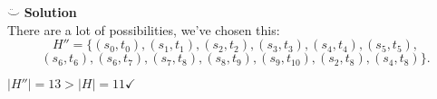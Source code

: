 $\ddot\smile$ \textbf{Solution}\\
There are a lot of possibilities, we've chosen this:\\
$$H'' = \{ (s_0, t_0), (s_1, t_1), (s_2, t_2), (s_3, t_3), (s_4, t_4), (s_5, t_5), $$
$$(s_6, t_6), (s_6, t_7), (s_7, t_8), (s_8, t_9), (s_9, t_{10}), (s_2,t_8), (s_4, t_8) \}.$$

$|H''| = 13 > |H| = 11 \checkmark$
